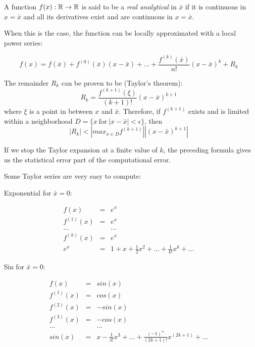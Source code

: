 \documentclass[justified,sixbynine]{tufte-book}
\theoremstyle{plain}%
\theoremstyle{definition}
\theoremstyle{remark}
\begin{document}
\begin{fullwidth}

A function $f(x):{\Bbb R}\rightarrow{\Bbb R}$ is said to be a {\it real analytical} in $\bar x$ if it is continuous in $x=\bar x$ and all its derivatives exist and are continuous in $x=\bar x$.

When this is the case, the function can be locally approximated with a local power series:

\begin{equation}
f(x) = f(\bar x) + f^{(0)}(\bar x)(x-\bar x) + ... + \frac{f^{(k)}(\bar x)}{n!}(x-\bar x)^k + R_k
\end{equation}

The remainder $R_k$ can be proven to be (Taylor's theorem):
\begin{equation}
R_k = \frac{f^{(k+1)}(\xi)}{(k+1)!}(x-\bar x)^{k+1}
\end{equation}
where $\xi$ is a point in between $x$ and $\bar x$. Therefore, if $f^{(k+1)}$ exists and is limited within a neighborhood $D = \{x~\textrm{for}~|x-\bar x|<\epsilon\}$, then
\begin{equation}
|R_k| < \left| max_{x\in D} f^{(k+1)} \right| |(x-\bar x)^{k+1}|
\end{equation}

If we stop the Taylor expansion at a finite value of $k$, the preceding formula gives us the statistical error part of the computational error.

Some Taylor series are very easy to compute:

Exponential for $\bar x = 0$:

\begin{eqnarray}
f(x) &=& e^x \\
f^{(1)}(x) &=& e^x \\
... && ... \\
f^{(k)}(x) &=& e^x \\
e^x &=&  1 + x + \frac12 x^2 + ... + \frac1{k!}x^k + ...
\end{eqnarray}

Sin for $\bar x = 0$:

\begin{eqnarray}
f(x) &=& sin(x) \\
f^{(1)}(x) &=& cos(x) \\
f^{(2)}(x) &=& -sin(x) \\
f^{(3)}(x) &=& -cos(x) \\
... && ... \\
sin(x) &=&  x - \frac1{3!}x^3 + ... + \frac{(-1)^n}{(2k+1)!}x^{(2k+1)} + ...
\end{eqnarray}


\end{fullwidth}
\end{document}

